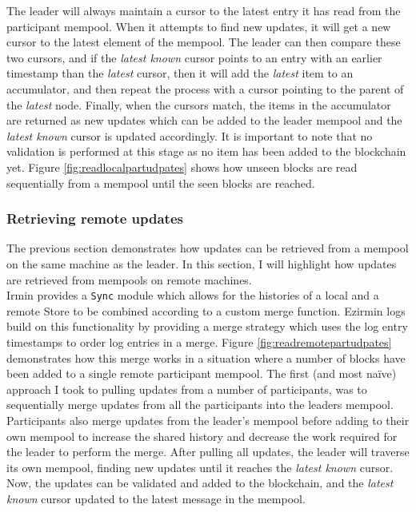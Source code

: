 \documentclass[12pt,a4paper,twoside,openright]{report}
\begin{document}
			The leader will always maintain a cursor to the latest entry it has read from the participant mempool.
			When it attempts to find new updates, it will get a new cursor to the latest element of the mempool.
			The leader can then compare these two cursors, and if the \textit{latest known} cursor points to an entry with an earlier timestamp than the \textit{latest} cursor, then it will add the \textit{latest} item to an accumulator, and then repeat the process with a cursor pointing to the parent of the \textit{latest} node. 
			Finally, when the cursors match, the items in the accumulator are returned as new updates which can be added to the leader mempool and the \textit{latest known} cursor is updated accordingly.
			It is important to note that no validation is performed at this stage as no item has been added to the blockchain yet.
			Figure \ref{fig:readlocalpartudpates} shows how unseen blocks are read sequentially from a mempool until the seen blocks are reached.
	
			\subsubsection*{Retrieving remote updates}
			The previous section demonstrates how updates can be retrieved from a mempool on the same machine as the leader.
			In this section, I will highlight how updates are retrieved from mempools on remote machines.\\
			
			Irmin provides a \texttt{Sync} module which allows for the histories of a local and a remote Store to be combined according to a custom merge function.
			Ezirmin logs build on this functionality by providing a merge strategy which uses the log entry timestamps to order log entries in a merge.
			Figure \ref{fig:readremotepartudpates} demonstrates how this merge works in a situation where a number of blocks have been added to a single remote participant mempool.
			The first (and most na{\"i}ve) approach I took to pulling updates from a number of participants, was to sequentially merge updates from all the participants into the leaders mempool.
			Participants also merge updates from the leader's mempool before adding to their own mempool to increase the shared history and decrease the work required for the leader to perform the merge.
			After pulling all updates, the leader will traverse its own mempool, finding new updates until it reaches the \textit{latest known} cursor. 
			Now, the updates can be validated and added to the blockchain, and the \textit{latest known} cursor updated to the latest message in the mempool.\\
\end{document}
